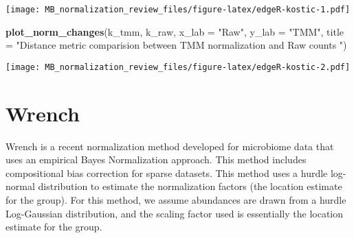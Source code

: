 \documentclass[
]{book}
\newenvironment{Shaded}{\begin{snugshade}}{\end{snugshade}}
\newcommand{\DataTypeTok}[1]{\textcolor[rgb]{0.13,0.29,0.53}{#1}}
\newcommand{\KeywordTok}[1]{\textcolor[rgb]{0.13,0.29,0.53}{\textbf{#1}}}
\newcommand{\NormalTok}[1]{#1}
\newcommand{\StringTok}[1]{\textcolor[rgb]{0.31,0.60,0.02}{#1}}
\begin{document}
\texttt{[image: MB\_normalization\_review\_files/figure-latex/edgeR-kostic-1.pdf]}

\begin{Shaded}
\begin{Highlighting}[]
\KeywordTok{plot\_norm\_changes}\NormalTok{(k\_tmm, k\_raw,}
                  \DataTypeTok{x\_lab =} \StringTok{"Raw"}\NormalTok{, }\DataTypeTok{y\_lab =} \StringTok{"TMM"}\NormalTok{,}
                  \DataTypeTok{title =} \StringTok{"Distance metric comparision between TMM normalization and Raw counts "}\NormalTok{)}
\end{Highlighting}
\end{Shaded}

\texttt{[image: MB\_normalization\_review\_files/figure-latex/edgeR-kostic-2.pdf]}

\hypertarget{wrench}{%
\chapter{Wrench}\label{wrench}}

Wrench is a recent normalization method developed for microbiome data \citep{kumar2018} that uses an empirical Bayes Normalization approach. This method includes compositional bias correction for sparse datasets. This method uses a hurdle log-normal distribution to estimate the normalization factors (the location estimate for the group). For this method, we assume abundances are drawn from a hurdle Log-Gaussian distribution, and the scaling factor used is essentially the location estimate for the group.
\end{document}
